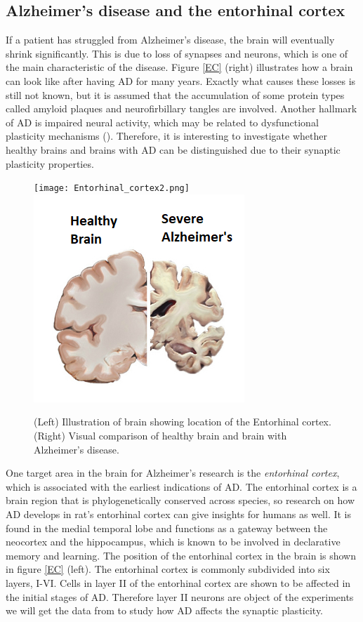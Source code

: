 \newpage

\subsection{Alzheimer's disease and the entorhinal cortex}
\label{EandA}

If a patient has struggled from Alzheimer's disease, the brain will eventually shrink significantly. This is due to loss of synapses and neurons, which is one of the main characteristic of the disease. Figure \ref{EC} (right) illustrates how a brain can look like after having AD for many years. Exactly what causes these losses is still not known, but it is assumed that the accumulation of some protein types called amyloid plaques and neurofirbillary tangles are involved. Another hallmark of AD is impaired neural activity, which may be related to dysfunctional plasticity mechanisms (\cite{Zott}). Therefore, it is interesting to investigate whether healthy brains and brains with AD can be distinguished due to their synaptic plasticity properties.

\begin{figure}[h]
    \caption{(Left) Illustration of brain showing location of the Entorhinal cortex. (Right) Visual comparison of healthy brain and brain with Alzheimer's disease.}
    \label{EC}
    \centering
    \texttt{[image: Entorhinal\_cortex2.png]}
    \includegraphics[scale=0.8]{fig/Alzheimers_picture.png}    
    \label{brain}
\end{figure} 

One target area in the brain for Alzheimer's research is the \textit{entorhinal cortex}, which is associated with the earliest indications of AD. The entorhinal cortex is a brain region that is phylogenetically conserved across species, so research on how AD develops in rat's entorhinal cortex can give insights for humans as well. It is found in the medial temporal lobe and functions as a gateway between the neocortex and the hippocampus, which is known to be involved in declarative memory and learning. The position  of the entorhinal cortex in the brain is shown in figure \ref{EC} (left). The entorhinal cortex is commonly subdivided into six layers, I-VI. Cells in layer II of the entorhinal cortex are shown to be affected in the initial stages of AD. Therefore layer II neurons are object of the experiments we will get the data from to study how AD affects the synaptic plasticity.


